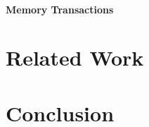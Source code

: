 \documentclass[conference, 10pt]{IEEEtran}
\begin{document}
\paragraph{Memory Transactions}

\label{sec:experiments}

\section{Related Work}
\label{sec:related-work}





\cite{ref:ocelot-pact}





\section{Conclusion}
\label{sec:conclusion}



\end{document}
